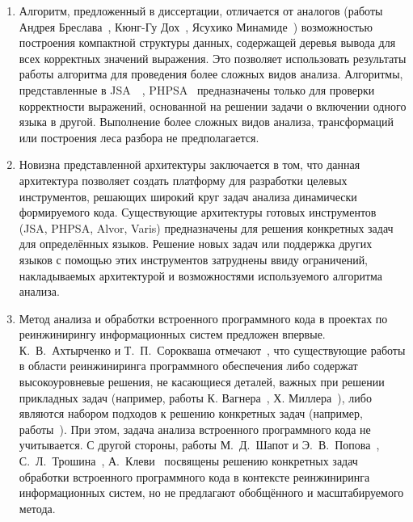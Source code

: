 \begin{enumerate}

\item Алгоритм, предложенный в диссертации, отличается от аналогов (работы Андрея Бреслава~\cite{Alvor1, Alvor2}, Кюнг-Гу Дох~\cite{LrAbstract1, LrAbstract2}, Ясухико Минамиде~\cite{PHPSA}) возможностью построения компактной структуры данных, содержащей деревья вывода для всех корректных значений выражения. Это позволяет использовать результаты работы алгоритма для проведения более сложных видов анализа. Алгоритмы, представленные в JSA~\cite{JSA}~\cite{Alvor1, Alvor2}, PHPSA~\cite{PHPSA} предназначены только для проверки корректности выражений, основанной на решении задачи о включении одного языка в другой. Выполнение более сложных видов анализа, трансформаций или построения леса разбора не предполагается. 

\item Новизна представленной архитектуры заключается в том, что данная архитектура позволяет создать платформу для разработки целевых инструментов, решающих широкий круг задач анализа динамически формируемого кода. Существующие архитектуры готовых инструментов (JSA, PHPSA, Alvor, Varis) предназначены для решения конкретных задач для определённых языков. Решение новых задач или поддержка других языков с помощью этих инструментов затруднены ввиду ограничений, накладываемых архитектурой и возможностями используемого алгоритма анализа. 

\item Метод анализа и обработки встроенного программного кода в проектах по реинжинирингу информационных систем предложен впервые. К.~В.~Ахтырченко и Т.~П.~Сорокваша отмечают~\cite{SoftwareReengMethods}, что существующие работы в области реинжиниринга программного обеспечения либо содержат высокоуровневые решения, не касающиеся деталей, важных при решении прикладных задач (например, работы К. Вагнера~\cite{SoftwareReeng3}, Х. Миллера~\cite{SoftwareReeng2}), либо являются набором подходов к решению конкретных задач (например, работы~\cite{SoftwareReeng1, reengANT, boulychev}). При этом, задача анализа встроенного программного кода не учитывается. С другой стороны, работы М.~Д.~Шапот и Э.~В.~Попова~\cite{DynamicDSQLTranslation}, С.~Л.~Трошина~\cite{reengANT}, А.~Клеви~\cite{DSQLReverseEngineering}  посвящены решению конкретных задач обработки встроенного программного кода в контексте реинжиниринга информационных систем, но не предлагают обобщённого и масштабируемого метода.

\end{enumerate}


